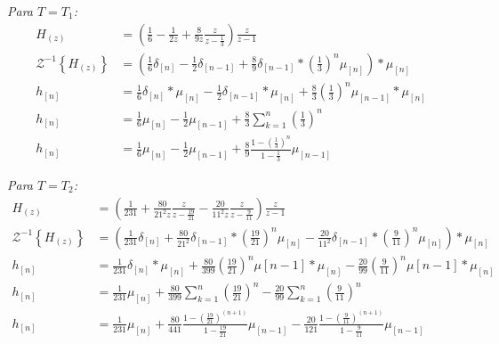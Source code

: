 \documentclass[a4paper,12pt]{report}
\begin{document}
\begin{enumerate}[label=\alph*), left=0pt]
                \textit{Para $T = T_1$:}
                \begin{align*}
                    H_{(z)} &= \left(\frac{1}{6} - \frac{1}{2z} + \frac{8}{9z}\frac{z}{z - \frac{1}{3}}\right) \frac{z}{z-1}\\
                    \mathcal{Z}^{-1}\left\{H_{(z)}\right\} &= \left(\frac{1}{6} \delta_{[n]} - \frac{1}{2} \delta_{[n - 1]} + \frac{8}{9} \delta_{[n - 1]} * \left(\frac{1}{3}\right)^n \mu_{[n]} \right) * \mu_{[n]}\\
                    h_{[n]} &= \frac{1}{6} \delta_{[n]} * \mu_{[n]} - \frac{1}{2} \delta_{[n - 1]} * \mu_{[n]} + \frac{8}{3} \left(\frac{1}{3}\right)^n \mu_{[n - 1]} * \mu_{[n]}\\
                    h_{[n]} &= \frac{1}{6} \mu_{[n]} - \frac{1}{2} \mu_{[n - 1]} + \frac{8}{3} \sum_{k=1}^n \left(\frac{1}{3}\right)^n\\
                    h_{[n]} &= \frac{1}{6} \mu_{[n]} - \frac{1}{2} \mu_{[n - 1]} + \frac{8}{9} \frac{1 - \left(\frac{1}{3}\right)^n}{1 - \frac{1}{3}} \mu_{[n-1]}
                \end{align*}

                \textit{Para $T = T_2$:}
                \begin{align*}
                    H_{(z)} &= \left(\frac{1}{231} + \frac{80}{21^2 z} \frac{z}{z - \frac{19}{21}} - \frac{20}{11^2 z} \frac{z}{z - \frac{9}{11}}\right) \frac{z}{z-1}\\
                    \mathcal{Z}^{-1}\left\{H_{(z)}\right\} &= \left(\frac{1}{231} \delta_{[n]} + \frac{80}{21^2} \delta_{[n - 1]} * \left(\frac{19}{21}\right)^n \mu_{[n]} - \frac{20}{11^2} \delta_{[n - 1]} * \left(\frac{9}{11}\right)^n \mu_{[n]}\right) * \mu_{[n]}\\
                    h_{[n]} &= \frac{1}{231} \delta_{[n]} * \mu_{[n]} + \frac{80}{399} \left(\frac{19}{21}\right)^{n} \mu{[n-1]} * \mu_{[n]}  - \frac{20}{99} \left(\frac{9}{11}\right)^{n} \mu{[n-1]} * \mu_{[n]}\\
                    h_{[n]} &= \frac{1}{231} \mu_{[n]} + \frac{80}{399} \sum_{k=1}^n \left(\frac{19}{21}\right)^{n} - \frac{20}{99} \sum_{k=1}^n \left(\frac{9}{11}\right)^{n}\\
                    h_{[n]} &= \frac{1}{231} \mu_{[n]} + \frac{80}{441} \frac{1 - \left(\frac{19}{21}\right)^{(n+1)}}{1 - \frac{19}{21}} \mu_{[n-1]} - \frac{20}{121} \frac{1 - \left(\frac{9}{11}\right)^{(n+1)}}{1 - \frac{9}{11}} \mu_{[n-1]}\\
                \end{align*}



\end{enumerate}
\end{document}
